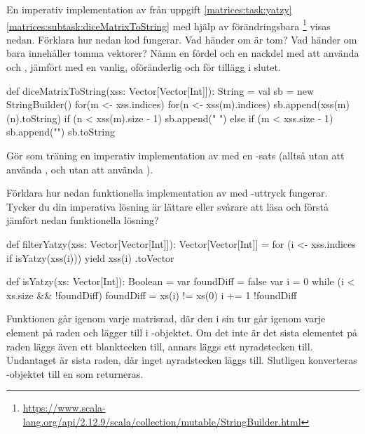 \Subtask En imperativ implementation av  från uppgift \ref{matrices:task:yatzy}\ref{matrices:subtask:diceMatrixToString} med hjälp av förändringsbara  \footnote{\url{https://www.scala-lang.org/api/2.12.9/scala/collection/mutable/StringBuilder.html}} visas nedan. Förklara hur nedan kod fungerar. Vad händer om  är tom? Vad händer om  bara innehåller tomma vektorer? Nämn en fördel och en nackdel med att använda  och , jämfört med en vanlig, oföränderlig  och \code{+} för tillägg i slutet.
\begin{Code}
def diceMatrixToString(xss: Vector[Vector[Int]]): String = {
  val sb = new StringBuilder()
  for(m <- xss.indices) {
    for(n <- xss(m).indices) {
      sb.append(xss(m)(n).toString)
      if (n < xss(m).size - 1) sb.append(" ")
      else if (m < xss.size - 1) sb.append("\n")
    }
  }
  sb.toString
}
\end{Code}

\Subtask Gör som träning en imperativ implementation av  med en -sats (alltså utan att använda , och utan att använda ).


\Subtask Förklara hur nedan funktionella implementation av  med -uttryck fungerar. Tycker du din imperativa lösning är lättare eller svårare att läsa och förstå jämfört nedan funktionella lösning?
\begin{CodeSmall}
def filterYatzy(xss: Vector[Vector[Int]]): Vector[Vector[Int]] = {
  for (i <- xss.indices if isYatzy(xss(i))) yield xss(i)
}.toVector
\end{CodeSmall}


\SOLUTION

\TaskSolved \what

\SubtaskSolved  \begin{Code}
def isYatzy(xs: Vector[Int]): Boolean = {
	var foundDiff = false
	var i = 0
	while (i < xs.size && !foundDiff) {
		foundDiff = xs(i) != xs(0)
		i += 1
	}
	!foundDiff
}
\end{Code}


\SubtaskSolved  Funktionen går igenom varje matrisrad, där den i sin tur går igenom
varje element på raden och lägger till i -objektet. Om det inte är
det sista elementet på raden läggs även ett blanktecken till, annars läggs ett
nyradstecken till. Undantaget är sista raden, där inget nyradstecken läggs till.
Slutligen konverteras -objektet till en  som
returneras.


